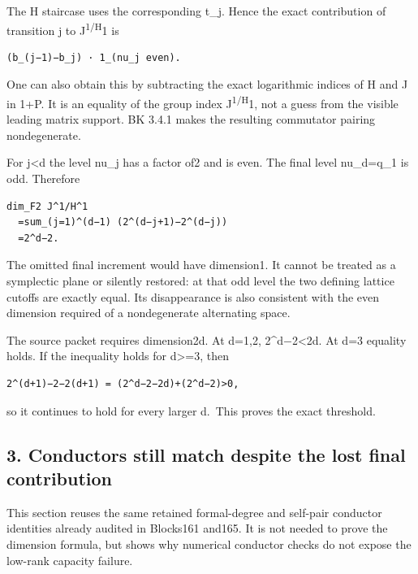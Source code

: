 The H staircase uses the corresponding t\_j. Hence the exact
contribution of transition j to J\textsuperscript{1/H}1 is

\begin{Verbatim}[fontsize=\small,breaklines=true,breakanywhere=true]
(b_(j−1)−b_j) · 1_(nu_j even).
\end{Verbatim}

One can also obtain this by subtracting the exact logarithmic indices of
H and J in 1+P. It is an equality of the group index
\textbar J\textsuperscript{1/H}1\textbar, not a guess from the visible
leading matrix support. BK 3.4.1 makes the resulting commutator pairing
nondegenerate.

For j\textless d the level nu\_j has a factor of2 and is even. The final
level nu\_d=q\_1 is odd. Therefore

\begin{Verbatim}[fontsize=\small,breaklines=true,breakanywhere=true]
dim_F2 J^1/H^1
  =sum_(j=1)^(d−1) (2^(d−j+1)−2^(d−j))
  =2^d−2.
\end{Verbatim}

The omitted final increment would have dimension1. It cannot be treated
as a symplectic plane or silently restored: at that odd level the two
defining lattice cutoffs are exactly equal. Its disappearance is also
consistent with the even dimension required of a nondegenerate
alternating space.

The source packet requires dimension2d. At d=1,2, 2\^{}d−2\textless2d.
At d=3 equality holds. If the inequality holds for d\textgreater=3, then

\begin{Verbatim}[fontsize=\small,breaklines=true,breakanywhere=true]
2^(d+1)−2−2(d+1) = (2^d−2−2d)+(2^d−2)>0,
\end{Verbatim}

so it continues to hold for every larger d.~This proves the exact
threshold.

\hypertarget{dyadic_capacity-conductors-still-match-despite-the-lost-final-contribution}{%
\subsection{3. Conductors still match despite the lost final
contribution}\label{dyadic_capacity-conductors-still-match-despite-the-lost-final-contribution}}

This section reuses the same retained formal-degree and self-pair
conductor identities already audited in Blocks161 and165. It is not
needed to prove the dimension formula, but shows why numerical conductor
checks do not expose the low-rank capacity failure.

